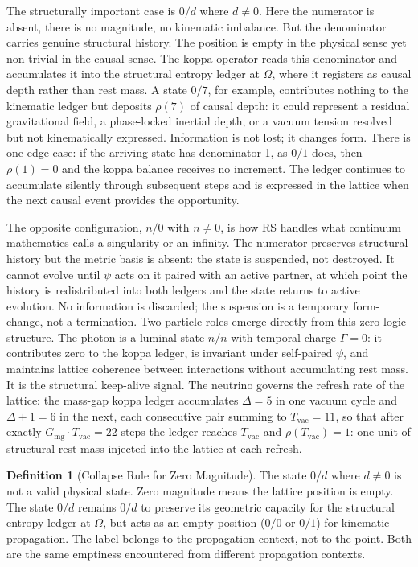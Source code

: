 \documentclass[11pt, letterpaper]{article}
\newcommand{\rank}{\rho}
\newcommand{\Tcharge}{\Gamma}
\theoremstyle{definition}
\newtheorem{definition}{Definition}[section]
\theoremstyle{plain}
\begin{document}
The structurally important case is $0/d$ where $d \neq 0$.  Here the numerator is
absent, there is no magnitude, no kinematic imbalance. But the denominator
carries genuine structural history. The position is empty in the physical sense yet
non-trivial in the causal sense.  The koppa operator reads this denominator and
accumulates it into the structural entropy ledger at $\Omega$, where it registers as
causal depth rather than rest mass.  A state $0/7$, for example, contributes nothing
to the kinematic ledger but deposits $\rank(7)$ of causal depth: it could represent a
residual gravitational field, a phase-locked inertial depth, or a vacuum tension
resolved but not kinematically expressed.  Information is not lost; it changes form.
There is one edge case: if the arriving state has denominator 1, as $0/1$ does, 
then $\rank(1) = 0$ and the koppa balance receives no increment.  The ledger continues
to accumulate silently through subsequent steps and is expressed in the lattice when
the next causal event provides the opportunity.

The opposite configuration, $n/0$ with $n \neq 0$, is how RS handles what continuum
mathematics calls a singularity or an infinity.  The numerator preserves structural
history but the metric basis is absent: the state is suspended, not destroyed.  It
cannot evolve until $\psi$ acts on it paired with an active partner, at which point the
history is redistributed into both ledgers and the state returns to active evolution.
No information is discarded; the suspension is a temporary form-change, not a
termination.  Two particle roles emerge directly from this zero-logic structure.  The
photon is a luminal state $n/n$ with temporal charge $\Tcharge = 0$: it contributes
zero to the koppa ledger, is invariant under self-paired $\psi$, and maintains lattice
coherence between interactions without accumulating rest mass.  It is the structural
keep-alive signal.  The neutrino governs the refresh rate of the lattice: the mass-gap
koppa ledger accumulates $\Delta = 5$ in one vacuum cycle and $\Delta + 1 = 6$ in the
next, each consecutive pair summing to $T_{\mathrm{vac}} = 11$, so that after exactly
$G_{\mathrm{mg}} \cdot T_{\mathrm{vac}} = 22$ steps the ledger reaches $T_{\mathrm{vac}}$
and $\rank(T_{\mathrm{vac}}) = 1$: one unit of structural rest mass injected into the
lattice at each refresh.

\begin{definition}[Collapse Rule for Zero Magnitude]\label{def:num-zero}
The state $0/d$ where $d\neq 0$ is not a valid physical state. Zero magnitude means the lattice position is empty. The state $0/d$ remains $0/d$ to preserve its geometric capacity for the structural entropy ledger at $\Omega$, but acts as an empty position ($0/0$ or $0/1$) for kinematic propagation. The label belongs to the propagation context, not to the point. Both are the same emptiness encountered from different propagation contexts.
\end{definition}
\end{document}
